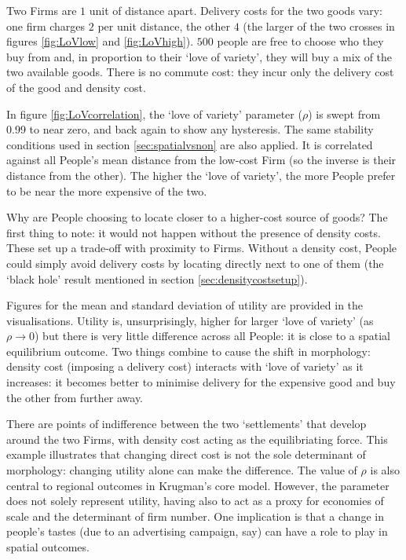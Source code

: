 Two Firms are $1$ unit of distance apart. Delivery costs for the two goods vary: one firm charges $2$ per unit distance, the other $4$ (the larger of the two crosses in figures \ref{fig:LoVlow} and \ref{fig:LoVhigh}). $500$ people are free to choose who they buy from and, in proportion to their `love of variety', they will buy a mix of the two available goods. There is no commute cost: they incur only the delivery cost of the good and density cost.

In figure \ref{fig:LoVcorrelation}, the `love of variety' parameter ($\rho$) is swept from 0.99 to near zero, and back again to show any hysteresis. The same stability conditions used in section \ref{sec:spatialvsnon} are also applied. It is correlated against all People's mean distance from the low-cost Firm (so the inverse is their distance from the other). The higher the `love of variety', the more People prefer to be near the more expensive of the two.

Why are People choosing to locate closer to a higher-cost source of goods? The first thing to note: it would not happen without the presence of density costs. These set up a trade-off with proximity to Firms. Without a density cost, People could simply avoid delivery costs by locating directly next to one of them (the `black hole' result mentioned in section \ref{sec:densitycostsetup}). 

Figures for the mean and standard deviation of utility are provided in the visualisations. Utility is, unsurprisingly, higher for larger `love of variety' (as $\rho \rightarrow 0$) but there is very little difference across all People: it is close to a spatial equilibrium outcome. Two things combine to cause the shift in morphology: density cost (imposing a delivery cost) interacts with `love of variety' as it increases: it becomes better to minimise delivery for the expensive good and buy the other from further away. 

There are points of indifference between the two `settlements' that develop around the two Firms, with density cost acting as the equilibriating force. This example illustrates that changing direct cost is not the sole determinant of morphology: changing utility alone can make the difference. The value of $\rho$ is also central to regional outcomes in Krugman's core model. However, the parameter does not solely represent utility, having also to act as a proxy for economies of scale and the determinant of firm number. One implication is that a change in people's tastes (due to an advertising campaign, say) can have a role to play in spatial outcomes.


